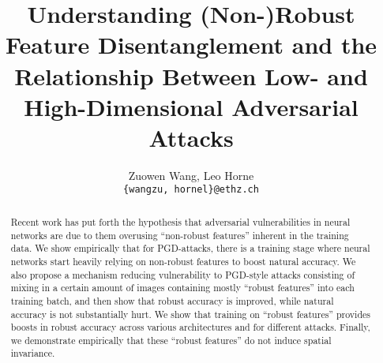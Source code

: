 \documentclass[a4paper,twocolumn,10pt]{article}
\title{Understanding (Non-)Robust Feature Disentanglement and the Relationship Between Low- and High-Dimensional Adversarial Attacks}
\author{
  \rm{Zuowen Wang, Leo Horne}\\
  \normalfont\texttt{\{wangzu, hornel\}@ethz.ch} \\
}
\begin{document}
\maketitle



\begin{abstract}

Recent work has put forth the hypothesis that adversarial vulnerabilities in neural networks are due to them overusing ``non-robust features'' inherent in the training data. We show empirically that for PGD-attacks, there is a training stage where neural networks start heavily relying on non-robust features to boost natural accuracy. We also propose a mechanism reducing vulnerability to PGD-style attacks consisting of mixing in a certain amount of images containing mostly ``robust features'' into each training batch, and then show that robust accuracy is improved, while natural accuracy is not substantially hurt. We show that training on ``robust features'' provides boosts in robust accuracy across various architectures and for different attacks. Finally, we demonstrate empirically that these ``robust features'' do not induce spatial invariance.

\end{abstract}






\end{document}
